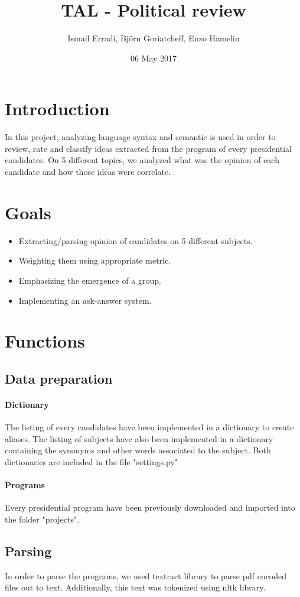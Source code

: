 \documentclass{article}
\title{TAL - Political review}
\author{ Ismail Erradi, Björn Goriatcheff, Enzo Hamelin  }
\date{06 May 2017}
\begin{document}
\maketitle

\section{Introduction}
    In this project, analyzing language syntax and semantic is used in order to review, rate and classify ideas extracted from the program of every presidential candidates. On 5 different topics, we analyzed what was the opinion of each candidate and how those ideas were correlate.
    
\section{Goals}
\begin {itemize}
\item Extracting/parsing opinion of candidates on 5 different subjects.
\item Weighting them using appropriate metric.
\item Emphasizing the emergence of a group.
\item Implementing an ask-answer system.
\end{itemize}


\section{Functions}
\subsection{Data preparation}
\paragraph{Dictionary}
The listing of every candidates have been implemented in a dictionary to create aliases.
The listing of subjects have also been implemented in a dictionary containing the synonyms and other words associated to the subject.
Both dictionaries are included in the file "settings.py"
\paragraph{Programs}
Every presidential program have been previously downloaded and imported into the folder "projects".

\subsection{Parsing}
In order to parse the programs, we used textract library to parse pdf encoded files out to text.
Additionally, this text was tokenized using nltk library.
\end{document}

